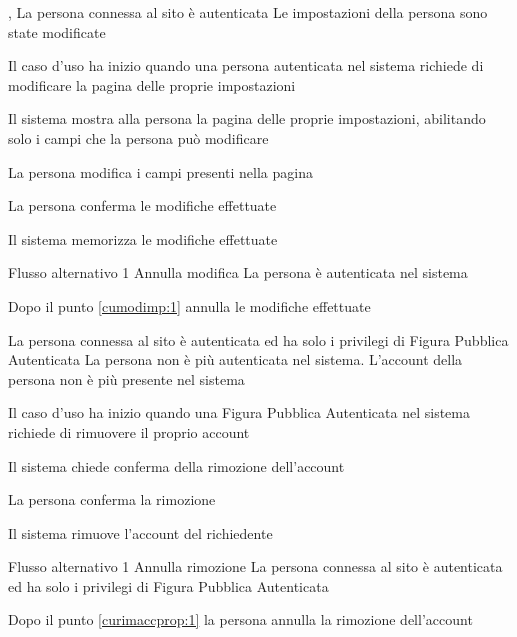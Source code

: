 {, }
{La persona connessa al sito è autenticata}
{Le impostazioni della persona sono state modificate}
{\begin{enumCU}
	\item Il caso d'uso ha inizio quando una persona autenticata nel sistema richiede di modificare la pagina delle proprie impostazioni
	\item Il sistema mostra alla persona la pagina delle proprie impostazioni, abilitando solo i campi che la persona può modificare
	\item La persona modifica i campi presenti nella pagina\label{cumodimp:1}
	\item La persona conferma le modifiche effettuate 
	\item Il sistema memorizza le modifiche effettuate
\end{enumCU}}
%
{Flusso alternativo 1}%
{Annulla modifica}%
{La persona è autenticata nel sistema}%
{\postNulle}%
{\begin{enumCU}
		\item Dopo il punto \ref{cumodimp:1} annulla le modifiche effettuate
	\end{enumCU}}%


{}
{La persona connessa al sito è autenticata ed ha solo i privilegi di Figura Pubblica Autenticata}
{La persona non è più autenticata nel sistema. L'account della persona non è più presente nel sistema}
{\begin{enumCU}
	\item Il caso d'uso ha inizio quando una Figura Pubblica Autenticata nel sistema richiede di rimuovere il proprio account
	\item Il sistema chiede conferma della rimozione dell'account\label{curimaccprop:1}
	\item La persona conferma la rimozione
	\item Il sistema rimuove l'account del richiedente
\end{enumCU}}
%
{Flusso alternativo 1}%
{Annulla rimozione}%
{La persona connessa al sito è autenticata ed ha solo i privilegi di Figura Pubblica Autenticata}%
{\postNulle}%
{\begin{enumCU}
		\item Dopo il punto \ref{curimaccprop:1} la persona annulla la rimozione dell'account
	\end{enumCU}}%

